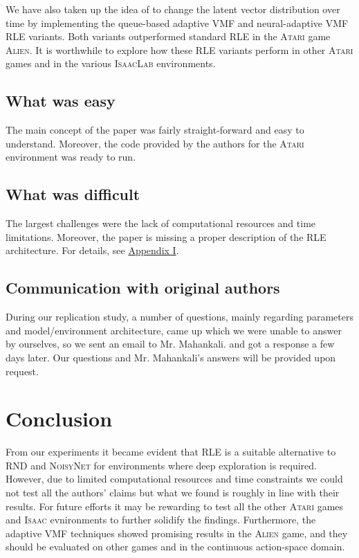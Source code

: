 \documentclass[10pt]{article} %
\begin{document}
We have also taken up the idea of \cite{rle-paper} to change the latent vector distribution over time by implementing the queue-based adaptive VMF and neural-adaptive VMF \textsc{RLE} variants. Both variants outperformed standard \textsc{RLE} in the \textsc{Atari} game \textsc{Alien}. It is worthwhile to explore how these \textsc{RLE} variants perform in other \textsc{Atari} games and in the various \textsc{IsaacLab} environments.

\subsection{What was easy}

The main concept of the paper was fairly straight-forward and easy to understand. Moreover, the code provided by the authors for the \textsc{Atari} environment was ready to run.

\subsection{What was difficult}

The largest challenges were the lack of computational resources and time limitations. Moreover, the paper is missing a proper description of the \textsc{RLE} architecture. For details, see \hyperlink{appendix-difficult}{Appendix I}.

\subsection{Communication with original authors}

During our replication study, a number of questions, mainly regarding parameters and model/environment architecture, came up which we were unable to answer by ourselves, so we sent an email to Mr. Mahankali. and got a response a few days later. Our questions and Mr. Mahankali's answers will be provided upon request. 

\vspace{-3pt}
\section{Conclusion}
\vspace{-3pt}

From our experiments it became evident that \textsc{RLE} is a suitable alternative to \textsc{RND} and \textsc{NoisyNet} for environments where deep exploration is required. However, due to limited computational resources and time constraints we could not test all the authors' claims but what we found is roughly in line with their results. For future efforts it may be rewarding to test all the other \textsc{Atari} games and \textsc{Isaac} evnironments to further solidify the findings. Furthermore, the adaptive VMF techniques showed promising results in the \textsc{Alien} game, and they should be evaluated on other games and in the continuous action-space domain.
\end{document}
